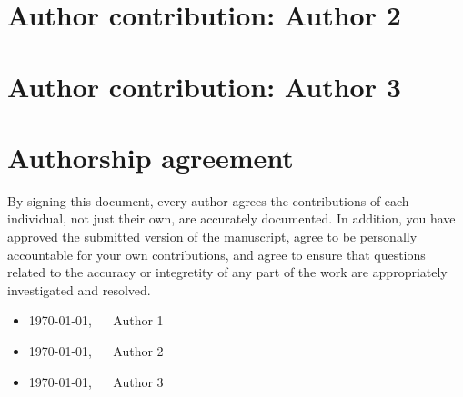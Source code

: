 \documentclass[10pt]{article}
\begin{document}
\section*{Author contribution: Author 2}

\section*{Author contribution: Author 3}

\section*{Authorship agreement}
By signing this document, every author agrees the contributions of each
individual, not just their own, are accurately documented. In addition, you
have approved the submitted version of the manuscript, agree to be personally
accountable for your own contributions, and agree to ensure that questions
related to the accuracy or integretity of any part of the work are
appropriately investigated and resolved.

\bigskip

\begin{itemize}[]
 \setlength\itemsep{3mm}
 \item \today, ~~ Author 1
 \item \today, ~~ Author 2
 \item \today, ~~ Author 3
\end{itemize}
\end{document}
